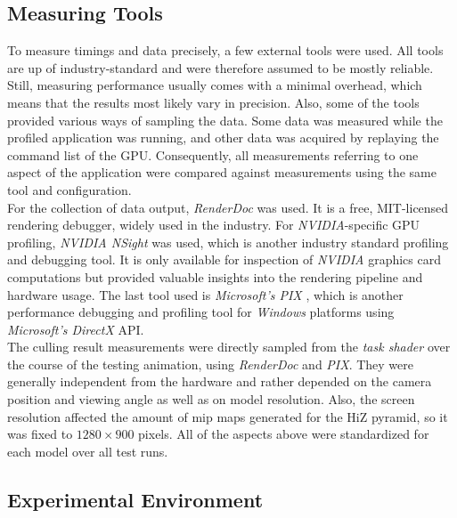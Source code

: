 \subsection*{Measuring Tools} \label{subsec-measuring-tools}

To measure timings and data precisely, a few external tools were used. All tools are up of industry-standard 
and were therefore assumed to be mostly reliable. Still, measuring performance usually comes with a minimal 
overhead, which means that the results most likely vary in precision. Also, some of the tools provided 
various ways of sampling the data. Some data was measured while the profiled application was running, and 
other data was acquired by replaying the command list of the \ac{GPU}. Consequently, all measurements 
referring to one aspect of the application were compared against measurements using the same tool and 
configuration. \\

\noindent
For the collection of data output, \emph{RenderDoc} \cite{RenderDoc} was used. It is a free, MIT-licensed 
rendering debugger, widely used in the industry. For \emph{NVIDIA}-specific \ac{GPU} profiling, \emph{NVIDIA NSight} 
\cite{NSight} was used, which is another industry standard profiling and debugging tool. It is only available for 
inspection of \emph{NVIDIA} graphics card computations but provided valuable insights into the rendering pipeline 
and hardware usage. The last tool used is \emph{Microsoft's PIX} \cite{PIX}, which is another performance debugging 
and profiling tool for \emph{Windows} platforms using \emph{Microsoft's DirectX} \ac{API}. \\

\noindent
The culling result measurements were directly sampled from the \emph{task shader} over the course of the testing 
animation, using \emph{RenderDoc} and \emph{PIX}. They were generally independent from the hardware and rather 
depended on the camera position and viewing angle as well as on model resolution. Also, the screen resolution 
affected the amount of mip maps generated for the \ac{HiZ} pyramid, so it was fixed to $1280 \times 900$ pixels. 
All of the aspects above were standardized for each model over all test runs.


\subsection*{Experimental Environment} \label{subsec-experimental-environment}

